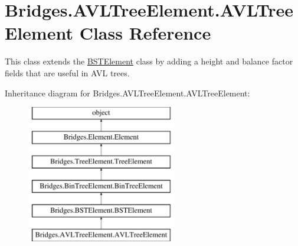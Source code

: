 \hypertarget{class_bridges_1_1_a_v_l_tree_element_1_1_a_v_l_tree_element}{}\section{Bridges.\+A\+V\+L\+Tree\+Element.\+A\+V\+L\+Tree\+Element Class Reference}
\label{class_bridges_1_1_a_v_l_tree_element_1_1_a_v_l_tree_element}


This class extends the \mbox{\hyperlink{namespace_bridges_1_1_b_s_t_element}{B\+S\+T\+Element}} class by adding a height and balance factor fields that are useful in A\+VL trees.  


Inheritance diagram for Bridges.\+A\+V\+L\+Tree\+Element.\+A\+V\+L\+Tree\+Element\+:\begin{figure}[H]
\begin{center}
\leavevmode
\includegraphics[height=6.000000cm]{class_bridges_1_1_a_v_l_tree_element_1_1_a_v_l_tree_element}
\end{center}
\end{figure}
